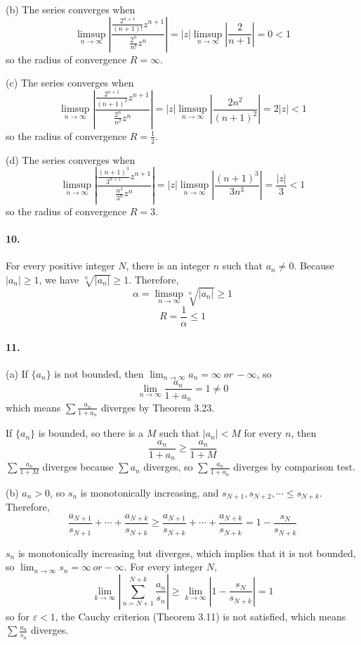 \documentclass[a4paper]{article}
\begin{document}
(b)
The series converges when 
\[
\limsup_{n\to\infty}\left|\frac{\frac{2^{n+1}}{(n+1)!}z^{n+1}}{\frac{2^n}{n!}z^n} \right|=|z|\limsup_{n\to\infty}\left|\frac{2}{n+1} \right|=0<1
\]
so the radius of convergence $R=\infty$.
\medskip

(c)
The series converges when 
\[
\limsup_{n\to\infty}\left|\frac{\frac{2^{n+1}}{(n+1)^2}z^{n+1}}{\frac{2^n}{n^2}z^n} \right|=|z|\limsup_{n\to\infty}\left|\frac{2n^2}{(n+1)^2} \right|=2|z|<1
\]
so the radius of convergence $R=\frac{1}{2}$.
\medskip

(d)
The series converges when 
\[
\limsup_{n\to\infty}\left|\frac{\frac{(n+1)^3}{3^{n+1}}z^{n+1}}{\frac{n^3}{3^n}z^n} \right|=|z|\limsup_{n\to\infty}\left|\frac{(n+1)^3}{3n^3} \right|=\frac{|z|}{3}<1
\]
so the radius of convergence $R=3$.

\paragraph{10.}
For every positive integer $N$, there is an integer $n$ such that $a_n\neq0$. Because $|a_n|\geq1$, we have $\sqrt[n]{|a_n|}\geq1$. Therefore, 
\[
\alpha=\limsup_{n\to\infty}\sqrt[n]{|a_n|}\geq1
\]
\[
R=\frac{1}{\alpha}\leq1
\]

\paragraph{11.}
(a) If $\{a_n\}$ is not bounded, then $\lim_{n\to\infty}a_n=\infty\;or\,-\infty$, so
\[
\lim_{n\to\infty}\frac{a_n}{1+a_n}=1\neq0
\]
which means $\sum\frac{a_n}{1+a_n}$ diverges by Theorem 3.23.

If $\{a_n\}$ is bounded, so there is a $M$ such that $|a_n|<M$ for every $n$, then
\[
\frac{a_n}{1+a_n}\geq\frac{a_n}{1+M}
\]
$\sum\frac{a_n}{1+M}$ diverges because $\sum a_n$ diverges, so $\sum\frac{a_n}{1+a_n}$ diverges by comparison test.
\medskip

(b)
$a_n>0$, so $s_n$ is monotonically increasing, and $s_{N+1},s_{N+2},\cdots\leq s_{N+k}$. Therefore, 
\[
\frac{a_{N+1}}{s_{N+1}}+\cdots+\frac{a_{N+k}}{s_{N+k}}\geq\frac{a_{N+1}}{s_{N+k}}+\cdots+\frac{a_{N+k}}{s_{N+k}}=1-\frac{s_N}{s_{N+k}}
\]

$s_n$ is monotonically increasing but diverges, which implies that it is not bounded, so $\lim_{n\to\infty}s_n=\infty\,or-\infty$. For every integer $N$,
\[
\lim_{k\to\infty}\left|\sum_{n=N+1}^{N+k}\frac{a_n}{s_n} \right|\geq\lim_{k\to\infty}\left|1-\frac{s_N}{s_{N+k}} \right|=1
\]
so for $\varepsilon<1$, the Cauchy criterion (Theorem 3.11) is not satisfied, which means $\sum\frac{a_n}{s_n}$ diverges.
\medskip
\end{document}
